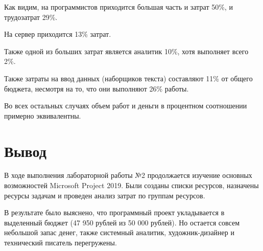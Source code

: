 Как видим, на программистов приходится большая часть и затрат 50\%, и трудозатрат 29\%.

На сервер приходится 13\% затрат.

Также одной из больших затрат является аналитик 10\%, хотя выполняет
всего 2\%.

Также затраты на ввод данных (наборщиков текста) составляют 11\% от общего бюджета, несмотря на то, что они выполняют 26\% работы.

Во всех остальных случаях объем работ и деньги в процентном соотношении примерно эквивалентны.


\section{Вывод}

В ходе выполнения лабораторной работы №2 продолжается изучение основных возможностей Microsoft Project 2019. Были созданы списки ресурсов, назначены ресурсы задачам и проведен анализ затрат по группам ресурсов.

В результате было выяснено, что программный проект укладывается в выделенный бюджет (47 950 рублей из 50 000 рублей). Но остается совсем небольшой запас денег, также системный аналитик, художник-дизайнер и технический писатель перегружены.
